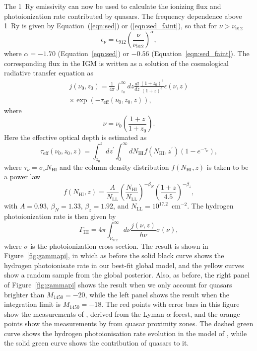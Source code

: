 \documentclass[a4paper,fleqn,usenatbib]{mnras}
\begin{document}
The 1~Ry emissivity can now be used to calculate the ionizing flux and
photoionization rate contributed by quasars.  The frequency dependence
above 1~Ry is given by Equation~(\ref{eqn:sed}) or
(\ref{eqn:sed_faint}), so that for $\nu > \nu_{912}$
\begin{equation}
  \epsilon_\nu = \epsilon_{912}\left(\frac{\nu}{\nu_{912}}\right)^\alpha,
  \label{eqn:epsilon_freq}
\end{equation}
where $\alpha=-1.70$ (Equation~\ref{eqn:sed}) or $-0.56$
(Equation~\ref{eqn:sed_faint}).  The corresponding flux in the IGM is
written as a solution of the cosmological radiative transfer equation
as \citep{2012ApJ...746..125H}
\begin{multline}
  j(\nu_0, z_0)=\frac{1}{4\pi}\int_{z_0}^\infty dz\frac{dl}{dz}\frac{(1+z_0)^3}{(1+z)^3}\epsilon(\nu,z)\\
  \times\exp{(-\tau_\mathrm{eff}(\nu_0, z_0, z))},
  \label{eqn:flux}
\end{multline}
where
\begin{equation}
  \nu = \nu_0\left(\frac{1+z}{1+z_0}\right).
\end{equation}
Here the effective optical depth is estimated as
\begin{equation}
  \tau_\mathrm{eff}(\nu_0, z_0, z) = \int_{z_0}^z dz^\prime\int_0^\infty dN_\mathrm{HI} f(N_\mathrm{HI}, z^\prime) (1-e^{-\tau_\nu}),
\end{equation}
where $\tau_\nu=\sigma_\nu N_\mathrm{HI}$ and the column density
distribution $f(N_\mathrm{HI}, z)$ is taken to be a power law \citep{2013MNRAS.436.1023B}
\begin{equation}
  f(N_\mathrm{HI}, z) = \frac{A}{N_\mathrm{LL}}\left(\frac{N_\mathrm{HI}}{N_\mathrm{LL}}\right)^{-\beta_N}\left(\frac{1+z}{4.5}\right)^{-\beta_z},
\end{equation}
with $A=0.93$, $\beta_N=1.33$, $\beta_z=1.92$, and
$N_\mathrm{LL}=10^{17.2}$~cm$^{-2}$.  The hydrogen photoionization
rate is then given by
\begin{equation}
  \Gamma_\mathrm{HI}=4\pi\int_{\nu_{912}}^\infty d\nu \frac{j(\nu,z)}{h\nu} \sigma(\nu),
\end{equation}
where $\sigma$ is the photoionization cross-section.  The result is
shown in Figure~\ref{fig:gammapi}, in which as before the solid black
curve shows the hydrogen photoionisate rate in our best-fit global
model, and the yellow curves show a random sample from the global
posterior.  Also, as before, the right panel of
Figure~\ref{fig:gammapi} shows the result when we only account for
quasars brighter than $M_{1450}=-20$, while the left panel shows the
result when the integration limit is $M_{1450}=-18$.  The red points
with error bars in this figure show the measurements of
\citet{2013MNRAS.436.1023B}, derived from the Lyman-$\alpha$ forest,
and the orange points show the measurements by
\citet{2011MNRAS.412.2543C} from quasar proximity zones.  The dashed
green curve shows the hydrogen photoionisation rate evolution in the
model of \citet{2012ApJ...746..125H}, while the solid green curve
shows the contribution of quasars to it.
\end{document}
